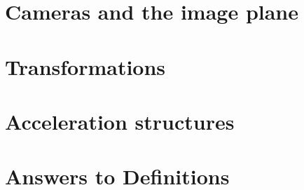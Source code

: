 \documentclass{article}
\begin{document}

\section{Cameras and the image plane}
\label{sec:cameras}


\section{Transformations}
\label{sec:transform}


\section{Acceleration structures}
\label{sec:accel}


\section{Answers to Definitions}





\end{document}
